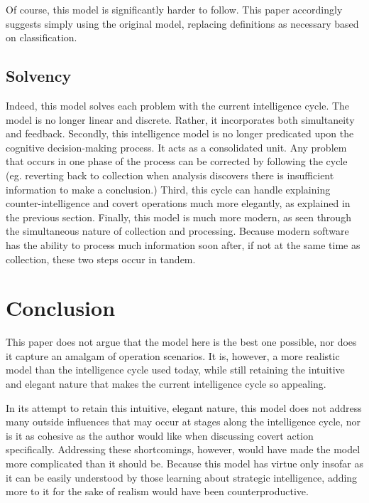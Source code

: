 \documentclass[10pt, letterpaper]{article}
\begin{document}
Of course, this model is significantly harder to follow. This paper accordingly suggests simply using the original model, replacing definitions as necessary based on classification.

\subsection{Solvency}
Indeed, this model solves each problem with the current intelligence cycle. The model is no longer linear and discrete. Rather, it incorporates both simultaneity and feedback. Secondly, this intelligence model is no longer predicated upon the cognitive decision-making process. It acts as a consolidated unit. Any problem that occurs in one phase of the process can be corrected by following the cycle (eg. reverting back to collection when analysis discovers there is insufficient information to make a conclusion.) Third, this cycle can handle explaining counter-intelligence and covert operations much more elegantly, as explained in the previous section. Finally, this model is much more modern, as seen through the simultaneous nature of collection and processing. Because modern software has the ability to process much information soon after, if not at the same time as collection, these two steps occur in tandem.

\newpage
\section{Conclusion}
This paper does not argue that the model here is the best one possible, nor does it capture an amalgam of operation scenarios. It is, however, a more realistic model than the intelligence cycle used today, while still retaining the intuitive and elegant nature that makes the current intelligence cycle so appealing.

In its attempt to retain this intuitive, elegant nature, this model does not address many outside influences that may occur at stages along the intelligence cycle, nor is it as cohesive as the author would like when discussing covert action specifically. Addressing these shortcomings, however, would have made the model more complicated than it should be. Because this model has virtue only insofar as it can be easily understood by those learning about strategic intelligence, adding more to it for the sake of realism would have been counterproductive.

\newpage
\end{document}
